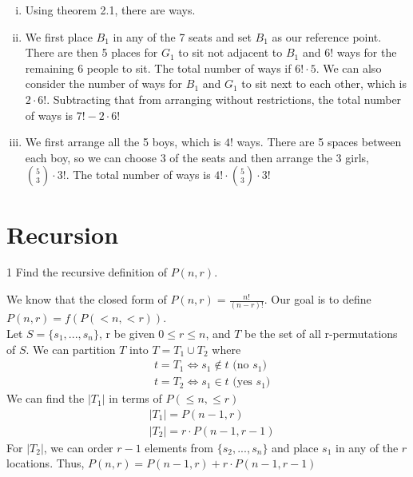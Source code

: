 \documentclass[11pt,twosided]{article}
\begin{document}
\begin{solution}
    \begin{enumerate}[(i)]
        \item Using theorem 2.1, there are  ways.
        \item We first place $B_1$ in any of the 7 seats and set $B_1$ as our reference point. There are then 5 places for $G_1$ to sit not adjacent to $B_1$ and 6! ways for the remaining 6 people to sit. The total number of ways if $\boxed{6! \cdot 5}$. We can also consider the number of ways for $B_1$ and $G_1$ to sit next to each other, which is $2 \cdot 6!$. Subtracting that from arranging without restrictions, the total number of ways is $\boxed{7! - 2 \cdot 6!}$ 
        \item We first arrange all the 5 boys, which is $4!$ ways. There are 5 spaces between each boy, so we can choose 3 of the seats and then arrange the 3 girls, $\binom{5}{3} \cdot 3!$. The total number of ways is $\boxed{4! \cdot \binom{5}{3} \cdot 3!}$
    \end{enumerate}
\end{solution}
\section{Recursion}
\begin{exercise}
    1 Find the recursive definition of $P(n,r)$.
\end{exercise}

\begin{solution}
    We know that the closed form of $P(n,r) = \frac{n!}{(n-r)!}$. Our goal is to define $P(n, r) = f(P(<n, <r))$.\\
    Let $S = \{s_1, ..., s_n\}$, r be given $0 \leq r \leq n$, and $T$ be the set of all r-permutations of $S$.
    \noindent
    We can partition $T$ into $T = T_1 \cup T_2$ where
    \begin{align*}
        &t = T_1 \Leftrightarrow s_1 \notin t \text{ (no $s_1$)}\\
        &t = T_2 \Leftrightarrow s_1 \in t \text{ (yes $s_1$)}
    \end{align*}
    We can find the $|T_1|$ in terms of $P(\leq n, \leq r)$
    \begin{align*}
        &|T_1| = P(n-1, r)\\
        &|T_2| = r \cdot P(n-1, r-1) 
    \end{align*}
    For $|T_2|$, we can order $r-1$ elements from $\{s_2, ..., s_n \}$ and place $s_1$ in any of the $r$ locations. Thus, $\boxed{P(n,r) = P(n-1,r) + r \cdot P(n-1, r-1)}$
\end{solution}
\end{document}
